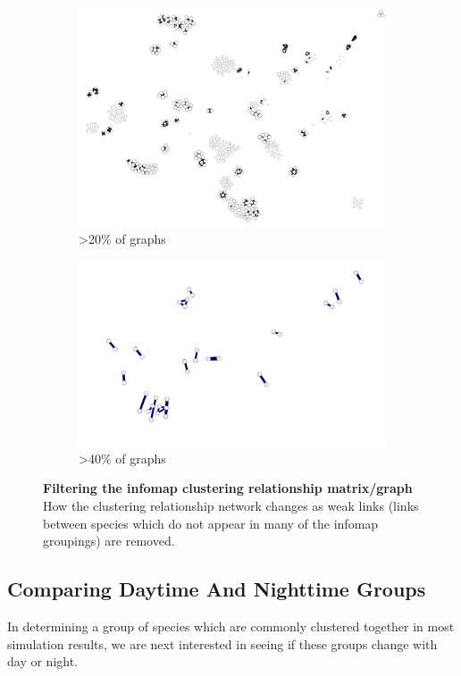 \begin{figure}[H]
\begin{subfigure}[t]{.5\textwidth}
  \centering
  \includegraphics[width=\textwidth]{fig/c3.png}
  \caption{>20\% of graphs}
\end{subfigure}%
\begin{subfigure}[t]{.5\textwidth}
  \centering
  \includegraphics[width=\textwidth]{fig/c4.png}
  \caption{>40\% of graphs}
\end{subfigure}%
\caption{\textbf{Filtering the infomap clustering relationship matrix/graph} How the clustering relationship network changes as weak links (links between species which do not appear in many of the infomap groupings) are removed. }
\label{fig:infomapprune}
\end{figure}

\subsection{Comparing Daytime And Nighttime Groups}
In determining a group of species which are commonly clustered together in most simulation results, we are next interested in seeing if these groups change with day or night.

